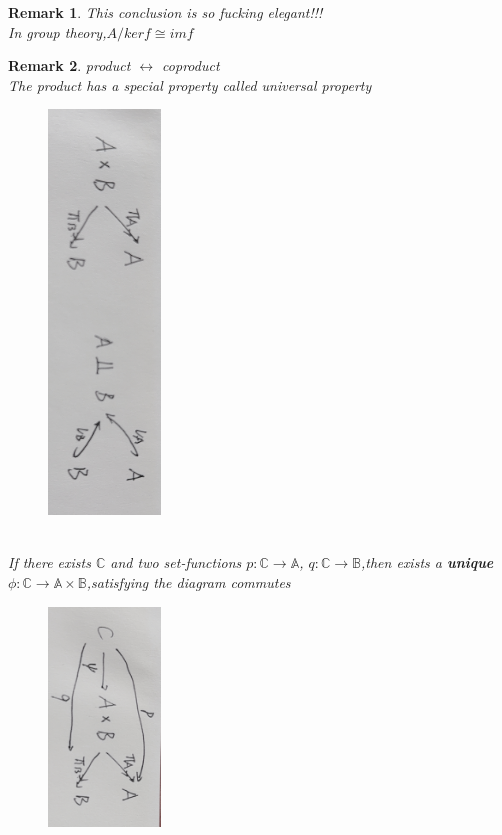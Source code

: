 \documentclass[13pt, a4paper, oneside]{book}
\newtheorem{remark}{Remark}[section]
\begin{document}
	\begin{remark}
		This conclusion is so fucking elegant!!! \\
		In group theory,$ A/kerf \cong imf $
	\end{remark}
	
	\begin{remark}
		product $\longleftrightarrow$ coproduct \\
		The product has a special property called universal property 
		\begin{figure}[h]
			\centering
			\includegraphics[width = 3cm, angle = 90]{Figures/F84C880A6B45B7D24D65345A7C341DFF.png}
		\end{figure} \\
		If there exists $\mathbb{C}$ and two set-functions $p:\mathbb{C} \longrightarrow \mathbb{A}$, $q: \mathbb{C} \longrightarrow \mathbb{B}$,then exists a \textbf{unique} $ \phi: \mathbb{C} \longrightarrow \mathbb{A} \times \mathbb{B} $,satisfying the diagram commutes 
		\begin{figure}[H]
			\centering
			\includegraphics[width = 3cm, angle = 90]{Figures/72123EE8EFB9534DE4F4F5E6AB791CB7.png}

\end{figure}
\end{remark}
\end{document}
